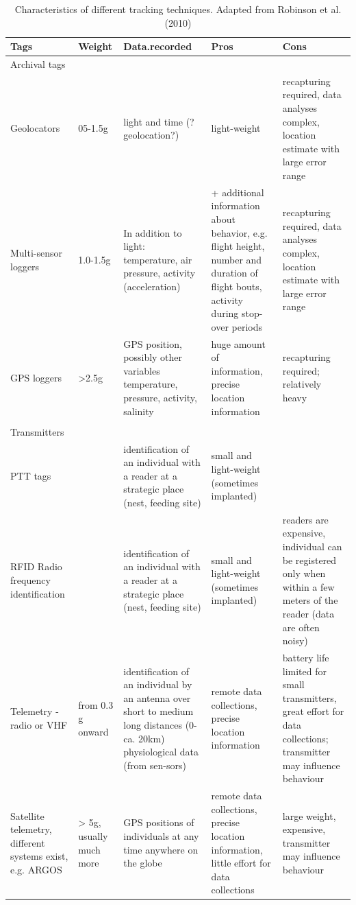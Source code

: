 \documentclass[
]{book}
\begin{document}
\begin{table}

\caption{\label{tab:unnamed-chunk-3}Characteristics of different tracking techniques. Adapted from Robinson et al. (2010)}
\centering
\begin{tabular}[t]{lllll}
\toprule
Tags & Weight & Data.recorded & Pros & Cons\\
\midrule
Archival tags &  &  &  & \\
Geolocators & 05-1.5g & light and time (?geolocation?) & light-weight & recapturing required, data analyses complex, location estimate with large error range\\
Multi-sensor loggers & 1.0-1.5g & In addition to light: temperature, air pressure, activity (acceleration) & + additional information about behavior, e.g. flight height, number and duration of flight bouts, activity during stop-over periods & recapturing required, data analyses complex, location estimate with large error range\\
GPS loggers & >2.5g & GPS position, possibly other variables temperature, pressure, activity, salinity & huge amount of information, precise location information & recapturing required; relatively heavy\\
 &  &  &  & \\
\addlinespace
Transmitters &  &  &  & \\
PTT tags &  & identification of an individual with a reader at a strategic place (nest, feeding site) & small and light-weight (sometimes implanted) & \\
RFID Radio frequency identification &  & identification of an individual with a reader at a strategic place (nest, feeding site) & small and light-weight (sometimes implanted) & readers are expensive, individual can be registered only when within a few meters of the reader (data are often noisy)\\
Telemetry - radio or VHF & from 0.3 g onward & identification of an individual by an antenna over short to medium long distances (0-ca. 20km)
physiological data (from sen-sors) & remote data collections, precise location information & battery life limited for small transmitters, great effort for data collections; transmitter may influence behaviour\\
Satellite telemetry, different systems exist, e.g. ARGOS & > 5g, usually much more & GPS positions of individuals at any time anywhere on the globe & remote data collections, precise location information, little effort for data collections & large weight, expensive, transmitter may influence behaviour\\
\bottomrule
\end{tabular}
\end{table}
\end{document}
